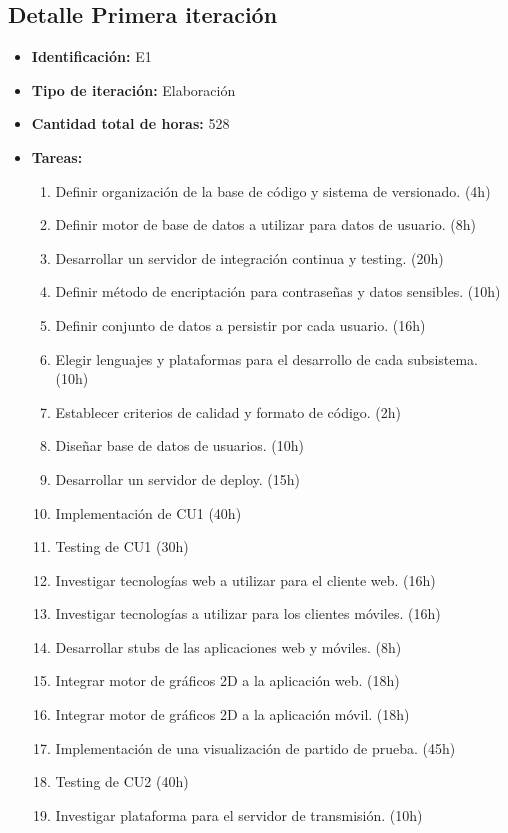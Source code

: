 \documentclass[a4paper, 10pt, twoside]{article}
\begin{document}
\subsection{Detalle Primera iteración}

\begin{itemize}
  \item \textbf{Identificación:} E1
  \item \textbf{Tipo de iteración:} Elaboración
  \item \textbf{Cantidad total de horas:} 528
  \item \textbf{Tareas:}
\begin{enumerate}
  \item Definir organización de la base de código y sistema de versionado. (4h)
  \item Definir motor de base de datos a utilizar para datos de usuario. (8h)
  \item Desarrollar un servidor de integración continua y testing. (20h)
  \item Definir método de encriptación para contraseñas y datos sensibles. (10h)
  \item Definir conjunto de datos a persistir por cada usuario. (16h)
  \item Elegir lenguajes y plataformas para el desarrollo de cada subsistema. (10h)
  \item Establecer criterios de calidad y formato de código. (2h)
  \item Diseñar base de datos de usuarios. (10h)
  \item Desarrollar un servidor de deploy. (15h)
  \item Implementación de CU1 (40h)
  \item Testing de CU1 (30h)
  \item Investigar tecnologías web a utilizar para el cliente web. (16h)
  \item Investigar tecnologías a utilizar para los clientes móviles. (16h)
  \item Desarrollar stubs de las aplicaciones web y móviles. (8h)
  \item Integrar motor de gráficos 2D a la aplicación web. (18h)
  \item Integrar motor de gráficos 2D a la aplicación móvil. (18h)
  \item Implementación de una visualización de partido de prueba. (45h)
  \item Testing de CU2 (40h)
  \item Investigar plataforma para el servidor de transmisión. (10h)

\end{enumerate}
\end{itemize}
\end{document}
